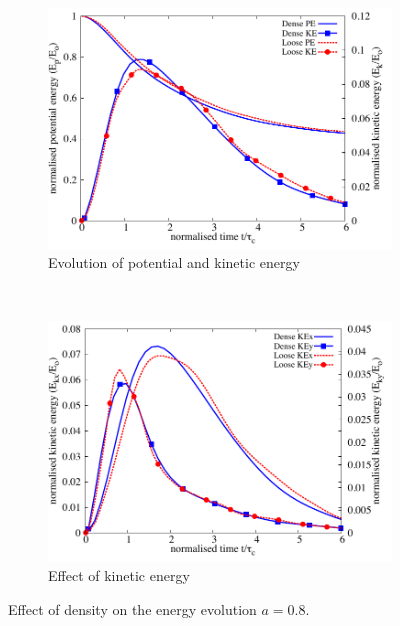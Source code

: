 \begin{figure}[tbhp]
\centering
\begin{subfigure}[b]{0.75\textwidth}
\centering
\includegraphics[width=\textwidth]{Energy_dense_r18}
\caption{Evolution of potential and kinetic energy}
\label{fig:Energy_dense_r18}
\end{subfigure}
\\
\begin{subfigure}[b]{0.75\textwidth}
\centering
\includegraphics[width=\textwidth]{KExy_dense_r18}
\caption{Effect of kinetic energy}
\label{fig:KExy_dense_r18}
\end{subfigure}
\caption{Effect of density on the energy evolution $a = 0.8$.}
\label{fig:Energy_density_r18}
\end{figure}


